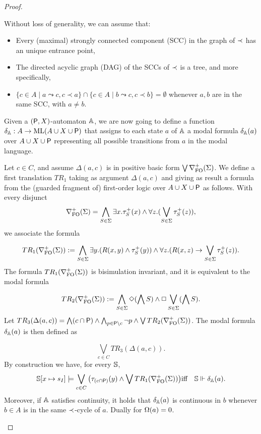 \begin{proof}
\begin{pfclaim}
Without loss of generality, we can assume that:
\begin{itemize}
 pt
\item Every (maximal) strongly connected component (SCC) in the graph of $\prec$ has an unique entrance point,
\item The directed acyclic graph (DAG) of the SCCs of $\prec$ is a tree, and more specifically,
\item 
$\{c \in A \mid a \leadsto c, c \prec a\}  \cap \{c \in A \mid b \leadsto c, c \prec b\}  = \emptyset$ whenever $a,b$ are in the same SCC, with $a\neq b$.
\end{itemize}

Given a $(\mathsf{P},X)$-automaton $\mathbb{A}$, we are now going to define a function $\delta_\mathbb{A}: A \to \mathrm{ML} (A \cup X \cup \mathsf{P})$
that assigns to each state $a$ of $\mathbb{A}$ a modal formula $\delta_\mathbb{A}(a)$ over  $A \cup X \cup \mathsf{P}$ representing all possible transitions from $a$ in the modal language.  

Let $c \in C$, and assume $\Delta(a,c)$ is in positive basic form $\bigvee \nabla^+_{\mathrm{FO}}(\Sigma)$. We define a first translation $TR_1$ taking as argument $\Delta(a,c)$ and giving as result a formula from the (guarded fragment of) first-order logic over $A \cup X \cup \mathsf{P}$ as follows. %
With every disjunct
$$
\nabla^+_{\mathrm{FO}}(\Sigma) = \bigwedge_{S\in\Sigma} \exists x. \tau^+_{S}(x) \land \forall z.( \bigvee_{S\in \Sigma} \tau^+_S(z)),
$$
we associate the formula

$$
TR_1(\nabla^+_{\mathrm{FO}}(\Sigma)) := \bigwedge_{S\in\Sigma} \exists y. (R(x,y) \land \tau^+_{S}(y)) \land \forall z.( R(x,z) \to \bigvee_{S\in \Sigma} \tau^+_S(z)).
$$
The formula $TR_1(\nabla^+_{\mathrm{FO}}(\Sigma))$ is bisimulation invariant, and it is equivalent to the modal formula

$$
TR_2(\nabla^+_{\mathrm{FO}}(\Sigma)) := \bigwedge_{S\in\Sigma}  \Diamond(\bigwedge S) \land \Box \bigvee_{S\in \Sigma} (\bigwedge S).
$$
Let $TR_3(\Delta(a,c))= \bigwedge (c \cap \mathsf{P}) \land \bigwedge_{p \in \mathsf{P} \setminus c} \lnot p \land \bigvee TR_2(\nabla^+_{\mathrm{FO}}(\Sigma))$.
 The modal formula $\delta_\mathbb{A}(a)$ is then defined as

 \[
 \bigvee_{c \in C} TR_3(\Delta(a,c)).
 \]
By construction we have, for every $\mathbb{S}$,
    \begin{eqnarray*}
    \model[x\mapsto s_I] \models \bigvee_{c \in C} \big (\tau_{(c \cap \prop)}(y) \land \bigvee TR_1(\posdbnfofo{\Sigma})\big) & \text{iff} &\model \mmodels \delta_\aut(a).
    \end{eqnarray*}
Moreover, if $\mathbb{A}$ satisfies continuity, it holds that $\delta_\mathbb{A}(a)$ is continuous in $b$ whenever $b \in A$ is in the same $\prec$-cycle of $a$. Dually for $\Omega(a)=0$.



\end{pfclaim}
\end{proof}

